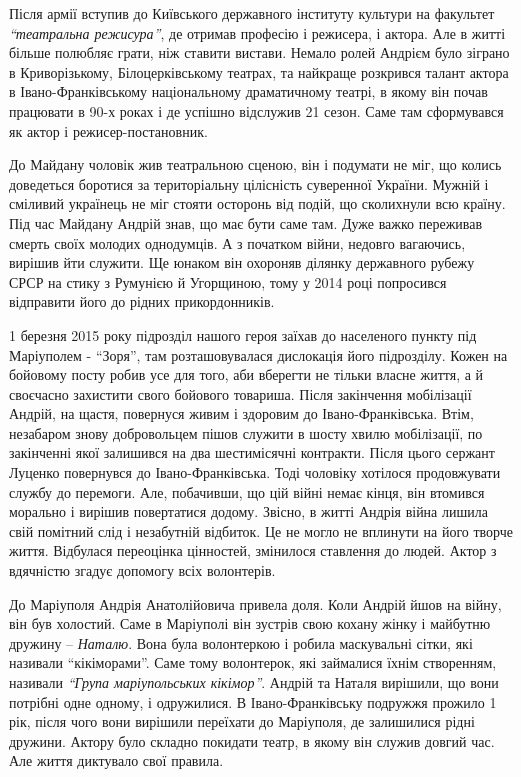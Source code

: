 Після армії вступив до Київського державного
інституту культури на факультет \emph{\enquote{театральна режисура}}, де отримав професію і
режисера, і актора. Але в житті більше полюбляє грати, ніж ставити вистави.
Немало ролей Андрієм було зіграно в Криворізькому, Білоцерківському театрах, та
найкраще розкрився талант актора в Івано-Франківському національному
драматичному театрі, в якому він почав працювати в 90-х роках і де успішно
відслужив 21 сезон. Саме там сформувався як актор і режисер-постановник.

До Майдану чоловік жив театральною сценою, він і подумати не міг, що колись
доведеться боротися за територіальну цілісність суверенної України. Мужній і
сміливий українець не міг стояти осторонь від подій, що сколихнули всю країну.
Під час Майдану Андрій знав, що має бути саме там. Дуже важко переживав смерть
своїх молодих однодумців. А з початком війни, недовго вагаючись, вирішив йти
служити. Ще юнаком він охороняв ділянку державного рубежу СРСР на стику з
Румунією й Угорщиною, тому у 2014 році попросився відправити його до рідних
прикордонників.


1 березня 2015 року підрозділ нашого героя заїхав до населеного пункту під
Маріуполем - \enquote{Зоря}, там розташовувалася дислокація його підрозділу. Кожен на
бойовому посту робив усе для того, аби вберегти не тільки власне життя, а й
своєчасно захистити свого бойового товариша. Після закінчення мобілізації
Андрій, на щастя, повернуся живим і здоровим до Івано-Франківська. Втім,
незабаром знову добровольцем пішов служити в шосту хвилю мобілізації, по
закінченні якої залишився на два шестимісячні контракти. Після цього сержант
Луценко повернувся до Івано-Франківська. Тоді чоловіку хотілося продовжувати
службу до перемоги. Але, побачивши, що цій війні немає кінця, він втомився
морально і вирішив повертатися додому. Звісно, в житті Андрія війна лишила свій
помітний слід і незабутній відбиток. Це не могло не вплинути на його творче
життя. Відбулася переоцінка цінностей, змінилося ставлення до людей. Актор з
вдячністю згадує допомогу всіх волонтерів.

До Маріуполя Андрія Анатолійовича привела доля. Коли Андрій йшов на війну, він
був холостий. Саме в Маріуполі він зустрів свою кохану жінку і майбутню дружину
– \emph{Наталю}. Вона була волонтеркою і робила маскувальні сітки, які називали
\enquote{кікіморами}. Саме тому волонтерок, які займалися їхнім створенням, називали
\emph{\enquote{Група маріупольських кікімор}}. Андрій та Наталя вирішили, що вони потрібні
одне одному, і одружилися. В Івано-Франківську подружжя прожило 1 рік, після
чого вони вирішили переїхати до Маріуполя, де залишилися рідні дружини. Актору
було складно покидати театр, в якому він служив довгий час. Але життя диктувало
свої правила.

